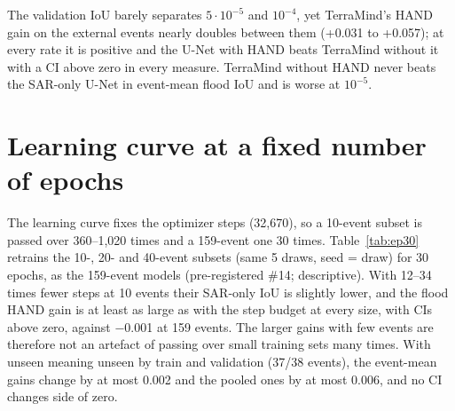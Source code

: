 \documentclass[journal,onecolumn]{IEEEtran}
\begin{document}
The validation IoU barely separates $5\cdot10^{-5}$ and $10^{-4}$, yet TerraMind's HAND gain on the external
events nearly doubles between them (+0.031 to +0.057); at every rate it is positive and the U-Net with HAND beats TerraMind without
it with a CI above zero in every measure. TerraMind without HAND never beats the SAR-only U-Net in
event-mean flood IoU and is worse at $10^{-5}$.

\section*{Learning curve at a fixed number of epochs}

The learning curve fixes the optimizer steps (32,670), so a 10-event subset is passed over 360--1,020 times
and a 159-event one 30 times. Table~\ref{tab:ep30} retrains the 10-, 20- and 40-event subsets (same 5 draws,
seed = draw) for 30 epochs, as the 159-event models (pre-registered \#14; descriptive). With 12--34 times
fewer steps at 10 events their SAR-only IoU is slightly lower, and the flood HAND gain is at least as large
as with the step budget at every size, with CIs above zero, against −0.001 at 159 events. The larger gains
with few events are therefore not an artefact of passing over small training sets many times. With unseen
meaning unseen by train and validation (37/38 events), the event-mean gains change by at most 0.002 and the
pooled ones by at most 0.006, and no CI changes side of zero.
\end{document}
